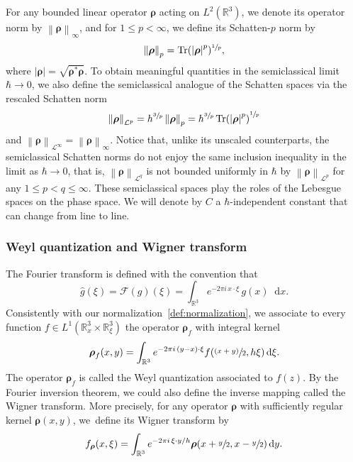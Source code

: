 \documentclass[11pt]{article}
\newcommand{\psfrac}[2]{\sfrac{(#1)}{#2}}
\newcommand {\aTr}[1] {\tr(#1)}
\theoremstyle{definition}
\newcommand {\RR} {\mathbb R}
\newcommand {\Rd} {\RR^3}
\renewcommand {\L} {\mathcal L}
\newcommand {\cL} {\mathcal L}
\newcommand {\ecF} {\mathscr{F}}
\let\lt\left
\let\rt\right
\renewcommand {\(} {\lt(}
\renewcommand {\)} {\rt)}
\newcommand {\n}[1] {\lt\lvert #1 \rt\rvert}
\newcommand {\nrm}[1] {\lt\lVert #1\rt\rVert}
\newcommand {\Nrm}[2] {\nrm{#1}_{#2}}
\renewcommand {\d} {\mathop{}\!\mathrm{d}}
\DeclareMathOperator{\tr} {Tr}
\newcommand {\F}[1] {\ecF\!\( #1 \)}
\newcommand {\Tr}[1] {\tr\!\( #1 \)}
\newcommand {\intd} {\int_{\Rd}}
\newcommand {\op} {\boldsymbol{\rho}}
\begin{document}
For any bounded linear operator $\op$ acting on $L^2(\Rd)$, we denote its operator norm by $\Nrm{\op}{\infty}$, and for $1\le p < \infty$, we define its Schatten-$p$ norm by
\begin{equation*}
\Nrm{\op}{p}= \aTr{\n{\op}^p}^{\sfrac1p},
\end{equation*}
where $\n{\op} = \sqrt{\op^\ast \op}$. To obtain meaningful quantities in the semiclassical limit \hbox{$\hbar\to 0$}, we also define the semiclassical analogue of the Schatten spaces via the rescaled Schatten norm
\begin{equation*}
\Nrm{\op}{\L^p} = h^{\sfrac3p} \Nrm{\op}{p}= h^{\sfrac3p}\Tr{\n{\op}^p}^{\sfrac1p}
\end{equation*}
and $\Nrm{\op}{\cL^\infty}=\Nrm{\op}{\infty}$. Notice that, unlike its unscaled counterparts, the semiclassical Schatten norms do not enjoy the same inclusion inequality in the limit as $\hbar\to 0$, that is, $\Nrm{\op}{\cL^q}$ is not bounded uniformly in $\hbar$ by $\Nrm{\op}{\cL^p}$ for any $1\le p< q\le \infty$. These semiclassical spaces play the roles of the Lebesgue spaces on the phase space. We will denote by $C$ a $\hbar$-independent constant that can change from line to line.

\subsubsection{Weyl quantization and Wigner transform} The Fourier transform is defined with the convention that
\begin{equation*}
\widehat g(\xi) = {\F{g}(\xi) =} \intd e^{-2\pi i\, x\cdot \xi}\,g(x)\d x.
\end{equation*}
Consistently with our normalization~\eqref{def:normalization}, we associate to every function \hbox{$f \!\in\! L^1(\Rd_x\!\times\!\Rd_{\xi})$} the operator $\op_f$ with integral kernel
\begin{equation*}
\op_f(x, y) = \intd e^{-2\pi i\, (y-x)\cdot \xi} f(\psfrac{x+y}{2}, h\xi)\d \xi.
\end{equation*}
The operator $\op_f$ is called the Weyl quantization associated to $f(z)$. By the Fourier inversion theorem, we could also define the inverse mapping called the Wigner transform. More precisely, for any operator $\op$ with sufficiently regular kernel $\op(x, y)$, we~define its Wigner transform by
\begin{equation*}
f_{\op}(x, \xi) = \intd e^{-2\pi i\, \xi\cdot y/h} \op(x+\sfrac{y}{2}, x-\sfrac{y}{2})\d y.
\end{equation*}
\end{document}
